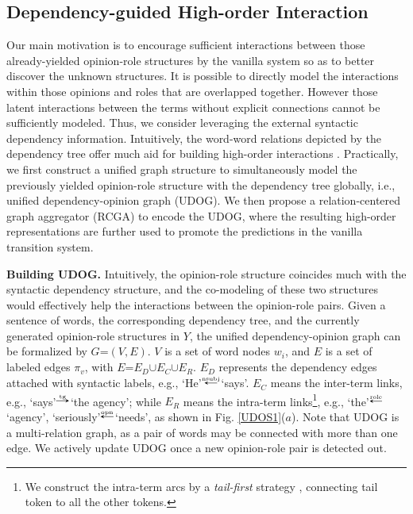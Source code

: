 \documentclass[letterpaper]{article} \usepackage{aaai22}  \usepackage{times}  \usepackage{helvet}  \usepackage{courier}  \usepackage[hyphens]{url}  \usepackage{graphicx} \urlstyle{rm} \def\UrlFont{\rm}  \usepackage{natbib}  \usepackage{caption} \DeclareCaptionStyle{ruled}{labelfont=normalfont,labelsep=colon,strut=off} \frenchspacing  \setlength{\pdfpagewidth}{8.5in}  \setlength{\pdfpageheight}{11in}  \usepackage{algorithm}
\newcommand\mrightarrow{\tikz \draw [->,>=stealth] (-0.2,-0.5) -- (0.2,-0.5);}
\newcommand\mleftarrow{\tikz \draw [->,>=stealth] (0.2,-0.5) -- (-0.2,-0.5);}
\begin{document}
\subsection{Dependency-guided High-order Interaction}

Our main motivation is to encourage sufficient interactions between those already-yielded opinion-role structures by the vanilla system so as to better discover the unknown structures.
It is possible to directly model the interactions within those opinions and roles that are overlapped together.
However those latent interactions between the terms without explicit connections cannot be sufficiently modeled.
Thus, we consider leveraging the external syntactic dependency information.
Intuitively, the word-word relations depicted by the dependency tree offer much aid for building high-order interactions \cite{li-etal-2020-high}.
Practically, we first construct a unified graph structure to simultaneously model the previously yielded opinion-role structure with the dependency tree globally, i.e., unified dependency-opinion graph (UDOG).
We then propose a relation-centered graph aggregator (RCGA) to encode the UDOG, where the resulting high-order representations are further used to promote the predictions in the vanilla transition system.














\noindent\textbf{Building UDOG.}
Intuitively, the opinion-role structure coincides much with the syntactic dependency structure, and the co-modeling of these two structures would effectively help the interactions between the opinion-role pairs.
Given a sentence of words, the corresponding dependency tree, and the currently generated opinion-role structures in $Y$, the unified dependency-opinion graph can be formalized by ${G}$=$({V}, {E})$.
${V}$ is a set of word nodes $w_i$, and ${E}$ is a set of labeled edges $\pi_v$, with ${E}$=${E}_D$$\cup$${E}_C$$\cup$${E}_R$.
${E}_D$ represents the dependency edges attached with syntactic labels, e.g., `He'$^{\overset{\text{nsubj}}{\mleftarrow}}$`says'.
${E}_C$ means the inter-term links, e.g., `says'$^{\overset{\text{tg}}{\mrightarrow}}$`the agency'; while ${E}_R$ means the intra-term links\footnote{We construct the intra-term arcs by a \emph{tail-first} strategy \cite{barnes-etal-2021-structured}, connecting tail token to all the other tokens.}, e.g., `the'$^{\overset{\text{role}}{\mleftarrow}}$`agency', `seriously'$^{\overset{\text{opn}}{\mleftarrow}}$`needs', as shown in Fig. \ref{UDOS1}($a$).
Note that UDOG is a multi-relation graph, as a pair of words may be connected with more than one edge.
We actively update UDOG once a new opinion-role pair is detected out.
\end{document}
